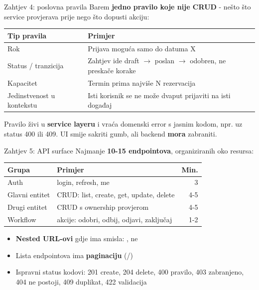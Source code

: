 \begin{frame}{Zahtjev 4: poslovna pravila}
Barem \textbf{jedno pravilo koje nije CRUD} - nešto što service provjerava prije nego što dopusti akciju:

\vspace{0.4em}
\begin{tabular}{@{}lp{7.2cm}@{}}
  \toprule
  \textbf{Tip pravila} & \textbf{Primjer} \\
  \midrule
  Rok & Prijava moguća samo do datuma X \\
  Status / tranzicija & Zahtjev ide draft $\rightarrow$ poslan $\rightarrow$ odobren, ne preskače korake \\
  Kapacitet & Termin prima najviše N rezervacija \\
  Jedinstvenost u kontekstu & Isti korisnik se ne može dvaput prijaviti na isti događaj \\
  \bottomrule
\end{tabular}

\vspace{0.6em}
Pravilo živi u \textbf{service layeru} i vraća domenski error s jasnim kodom, npr.  uz status 400 ili 409. UI smije sakriti gumb, ali backend \textbf{mora} zabraniti.
\end{frame}

\begin{frame}{Zahtjev 5: API surface}
Najmanje \textbf{10-15 endpointova}, organiziranih oko resursa:

\vspace{0.4em}
\begin{tabular}{@{}llr@{}}
  \toprule
  \textbf{Grupa} & \textbf{Primjer} & \textbf{Min.} \\
  \midrule
  Auth & login, refresh, me & 3 \\
  Glavni entitet & CRUD: list, create, get, update, delete & 4-5 \\
  Drugi entitet & CRUD s ownership provjerom & 4-5 \\
  Workflow & akcije: odobri, odbij, odjavi, zaključaj & 1-2 \\
  \bottomrule
\end{tabular}

\vspace{0.6em}
\begin{itemize}
  \item \textbf{Nested URL-ovi} gdje ima smisla: , ne 
  \item Lista endpointova ima \textbf{paginaciju} (/)
  \item Ispravni status kodovi: 201 create, 204 delete, 400 pravilo, 403 zabranjeno, 404 ne postoji, 409 duplikat, 422 validacija
\end{itemize}
\end{frame}

